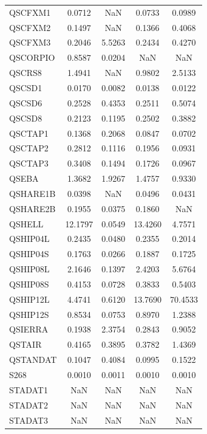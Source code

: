 \begin{longtable}{lcccc}
QSCFXM1  &   0.0712 &      NaN &   0.0733 &   0.0989 \\
QSCFXM2  &   0.1497 &      NaN &   0.1366 &   0.4068 \\
QSCFXM3  &   0.2046 &   5.5263 &   0.2434 &   0.4270 \\
QSCORPIO &   0.8587 &   0.0204 &      NaN &      NaN \\
QSCRS8   &   1.4941 &      NaN &   0.9802 &   2.5133 \\
QSCSD1   &   0.0170 &   0.0082 &   0.0138 &   0.0122 \\
QSCSD6   &   0.2528 &   0.4353 &   0.2511 &   0.5074 \\
QSCSD8   &   0.2123 &   0.1195 &   0.2502 &   0.3882 \\
QSCTAP1  &   0.1368 &   0.2068 &   0.0847 &   0.0702 \\
QSCTAP2  &   0.2812 &   0.1116 &   0.1956 &   0.0931 \\
QSCTAP3  &   0.3408 &   0.1494 &   0.1726 &   0.0967 \\
QSEBA    &   1.3682 &   1.9267 &   1.4757 &   0.9330 \\
QSHARE1B &   0.0398 &      NaN &   0.0496 &   0.0431 \\
QSHARE2B &   0.1955 &   0.0375 &   0.1860 &      NaN \\
QSHELL   &  12.1797 &   0.0549 &  13.4260 &   4.7571 \\
QSHIP04L &   0.2435 &   0.0480 &   0.2355 &   0.2014 \\
QSHIP04S &   0.1763 &   0.0266 &   0.1887 &   0.1725 \\
QSHIP08L &   2.1646 &   0.1397 &   2.4203 &   5.6764 \\
QSHIP08S &   0.4153 &   0.0728 &   0.3833 &   0.5403 \\
QSHIP12L &   4.4741 &   0.6120 &  13.7690 &  70.4533 \\
QSHIP12S &   0.8534 &   0.0753 &   0.8970 &   1.2388 \\
QSIERRA  &   0.1938 &   2.3754 &   0.2843 &   0.9052 \\
QSTAIR   &   0.4165 &   0.3895 &   0.3782 &   1.4369 \\
QSTANDAT &   0.1047 &   0.4084 &   0.0995 &   0.1522 \\
S268     &   0.0010 &   0.0011 &   0.0010 &   0.0010 \\
STADAT1  &      NaN &      NaN &      NaN &      NaN \\
STADAT2  &      NaN &      NaN &      NaN &      NaN \\
STADAT3  &      NaN &      NaN &      NaN &      NaN \\

\end{longtable}
